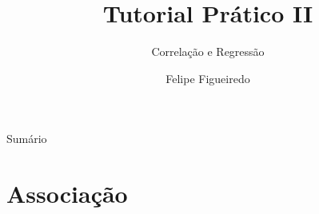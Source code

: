 \documentclass{beamer}
\title%
{Tutorial Prático II}
\subtitle
{Correlação e Regressão} %
\author%
{Felipe Figueiredo}%
\institute[] %
{Instituto Nacional de Traumatologia e Ortopedia
}
\date%
{}
\begin{document}
\begin{frame}
  \titlepage
\end{frame}

\begin{frame}{Sumário}
  \tableofcontents
\end{frame}








\section{Associação}
\end{document}
